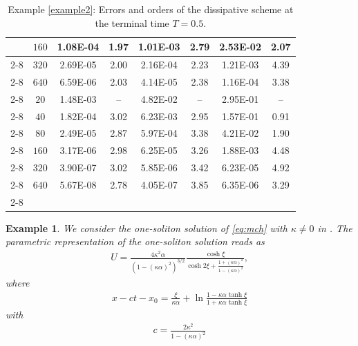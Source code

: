\documentclass[11pt]{article}
\newtheorem{exmp}{Example}[section]
\numberwithin{equation}{section}
\begin{document}
\begin{table}[!ht]
\begin{tabular}{|c|c|cc|cc|cc|}
& $  160$ &    1.08E-04&     1.97 &    1.01E-03&     2.79	&    2.53E-02&     2.07	 \\ \cline{2-8}
& $  320$ &    2.69E-05&     2.00 &    2.16E-04&     2.23	&    1.21E-03&     4.39	 \\ \cline{2-8}
& $  640$ &    6.59E-06&     2.03 &    4.14E-05&     2.38	&    1.16E-04&     3.38	 \\ \cline{2-8} \hline
\multirow{6}{0.6cm}{$\mathcal{P}_3$}& $   20$ &    1.48E-03&      --  &    4.82E-02&      --    &    2.95E-01&      --   \\ \cline{2-8}
& $   40$ &    1.82E-04&     3.02 &    6.23E-03&     2.95	&    1.57E-01&     0.91	 \\ \cline{2-8}
& $   80$ &    2.49E-05&     2.87 &    5.97E-04&     3.38	&    4.21E-02&     1.90	 \\ \cline{2-8}
& $  160$ &    3.17E-06&     2.98 &    6.25E-05&     3.26	&    1.88E-03&     4.48	 \\ \cline{2-8}
& $  320$ &    3.90E-07&     3.02 &    5.85E-06&     3.42	&    6.23E-05&     4.92	 \\ \cline{2-8}
& $  640$ &    5.67E-08&     2.78 &    4.05E-07&     3.85	&    6.35E-06&     3.29	 \\ \cline{2-8} \hline
\end{tabular}

\caption{ Example \ref{example2}: Errors and orders of the dissipative scheme at the terminal time $T=0.5$. }\label{tab_ex2_tab_err2}

\end{table}


\begin{exmp}\label{example_kappa_1}
We consider the one-soliton solution of \eqref{eq:mch} with $\kappa\neq0$ in \cite{MatsunoJPA2014}. The parametric representation of the one-soliton solution reads as
\begin{align*}
U=\frac{4\kappa^2 \alpha}{(1-(\kappa \alpha)^2)^{3/2}}\frac{\cosh \xi}{\cosh 2\xi +\frac{1+(\kappa \alpha)^2}{1-(\kappa \alpha)^2}},
\end{align*}
where
\begin{align*}
x-ct-x_0=\frac{\xi}{\kappa \alpha}+ \ln \frac{1-\kappa \alpha \tanh \xi}{1+\kappa \alpha \tanh \xi}
\end{align*}
with
\begin{align*}
c=\frac{2\kappa ^2}{1-(\kappa \alpha)^2}
\end{align*}
\end{exmp}
\end{document}
